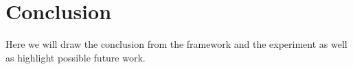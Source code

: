 \section{Conclusion}
Here we will draw the conclusion from the framework and the experiment as well as highlight possible future work.
